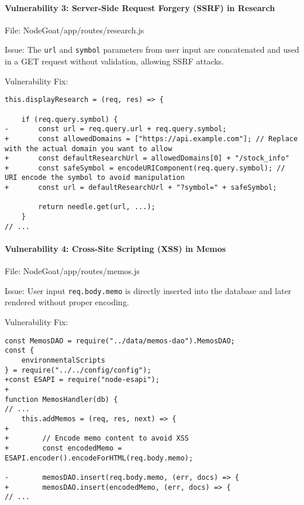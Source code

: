   \hypertarget{vulnerability-3-server-side-request-forgery-ssrf-in-research}{%
  \paragraph{Vulnerability 3: Server-Side Request Forgery (SSRF) in
  Research}\label{vulnerability-3-server-side-request-forgery-ssrf-in-research}}
  
  File: NodeGoat/app/routes/research.js
  
  Issue: The \texttt{url} and \texttt{symbol} parameters from user input
  are concatenated and used in a GET request without validation, allowing
  SSRF attacks.
  
  Vulnerability Fix:
  
  \begin{framed}\scriptsize
    \begin{verbatim}
this.displayResearch = (req, res) => {

    if (req.query.symbol) {
-       const url = req.query.url + req.query.symbol;
+       const allowedDomains = ["https://api.example.com"]; // Replace with the actual domain you want to allow
+       const defaultResearchUrl = allowedDomains[0] + "/stock_info"
+       const safeSymbol = encodeURIComponent(req.query.symbol); // URI encode the symbol to avoid manipulation
+       const url = defaultResearchUrl + "?symbol=" + safeSymbol;

        return needle.get(url, ...);
    }
// ...
      \end{verbatim}
      
  \end{framed}\normalsize
  
  \hypertarget{vulnerability-4-cross-site-scripting-xss-in-memos}{%
  \paragraph{Vulnerability 4: Cross-Site Scripting (XSS) in
  Memos}\label{vulnerability-4-cross-site-scripting-xss-in-memos}}
  
  File: NodeGoat/app/routes/memos.js
  
  Issue: User input \texttt{req.body.memo} is directly inserted into the
  database and later rendered without proper encoding.
  
  Vulnerability Fix:
  
  \begin{framed}\scriptsize
\begin{verbatim}
const MemosDAO = require("../data/memos-dao").MemosDAO;
const {
    environmentalScripts
} = require("../../config/config");
+const ESAPI = require("node-esapi");
+
function MemosHandler(db) {
// ...
    this.addMemos = (req, res, next) => {
+
+        // Encode memo content to avoid XSS
+        const encodedMemo = ESAPI.encoder().encodeForHTML(req.body.memo);

-        memosDAO.insert(req.body.memo, (err, docs) => {
+        memosDAO.insert(encodedMemo, (err, docs) => {
// ...
\end{verbatim}
      
  \end{framed}\normalsize
  
